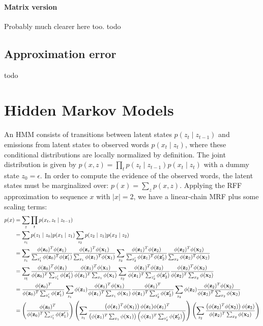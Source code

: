 \documentclass{article}
\begin{document}
\paragraph{Matrix version}
Probably much clearer here too.
todo

\subsection{Approximation error}
todo

\section{Hidden Markov Models}
An HMM consists of transitions between latent states $p(z_t \mid z_{t-1})$
and emissions from latent states to observed words $p(x_t \mid z_t)$,
where these conditional distributions are locally normalized by definition.
The joint distribution is given by $p(x, z) = \prod_t p(z_t \mid z_{t-1})p(x_t \mid z_t)$
with a dummy state $z_0 = \epsilon$.
In order to compute the evidence of the observed words, the latent states must be
marginalized over: $p(x) = \sum_z p(x,z)$.
Applying the RFF approximation to sequence $x$ with $|x| = 2$, we have
a linear-chain MRF plus some scaling terms:
\begin{equation}
\begin{aligned}
p(x) &= \sum_z \prod_t p(x_t,z_t\mid z_{t-1})\\
&= \sum_{z_1} p(z_1 \mid z_0)p(x_1 \mid z_1)  \sum_{z_2} p(z_2 \mid z_1)p(x_2 \mid z_2)\\
&= \sum_{z_1} \frac{\phi(\mathbf{z}_0)^T\phi(\mathbf{z}_1)}{\sum_{z_1'}\phi(\mathbf{z}_0)^T\phi(\mathbf{z}'_1)}
\frac{\phi(\mathbf{z}_z)^T\phi(\mathbf{x}_1)}{\sum_{x_1}\phi(\mathbf{z}_1)^T\phi(\mathbf{x}_1)}
\sum_{z_2} \frac{\phi(\mathbf{z}_1)^T\phi(\mathbf{z}_2)}{\sum_{z_2'}\phi(\mathbf{z}_1)^T\phi(\mathbf{z}_2')}
\frac{\phi(\mathbf{z}_2)^T\phi(\mathbf{x}_2)}{\sum_{x_2}\phi(\mathbf{z}_2)^T\phi(\mathbf{x}_2)}\\
&= \sum_{z_1} \frac{\phi(\mathbf{z}_0)^T\phi(\mathbf{z}_1)}{\phi(\mathbf{z}_0)^T\sum_{z_1'}\phi(\mathbf{z}'_1)}
\frac{\phi(\mathbf{z}_1)^T\phi(\mathbf{x}_1)}{\phi(\mathbf{z}_1)^T\sum_{x_1}\phi(\mathbf{x}_1)}
\sum_{z_2} \frac{\phi(\mathbf{z}_1)^T\phi(\mathbf{z}_2)}{\phi(\mathbf{z}_1)^T\sum_{z_2'}\phi(\mathbf{z}_2')}
\frac{\phi(\mathbf{z}_2)^T\phi(\mathbf{x}_2)}{\phi(\mathbf{z}_2)^T\sum_{x_2}\phi(\mathbf{x}_2)}\\
&= \frac{\phi(\mathbf{z}_0)^T}{\phi(\mathbf{z}_0)^T\sum_{z_1'}\phi(\mathbf{z}'_1)}\sum_{z_1} \phi(\mathbf{z}_1)
\frac{\phi(\mathbf{z}_1)^T\phi(\mathbf{x}_1)}{\phi(\mathbf{z}_1)^T\sum_{x_1}\phi(\mathbf{x}_1)}
\frac{\phi(\mathbf{z}_1)^T}{\phi(\mathbf{z}_1)^T\sum_{z_2'}\phi(\mathbf{z}_2')}
\sum_{z_2} \phi(\mathbf{z}_2)
\frac{\phi(\mathbf{z}_2)^T\phi(\mathbf{x}_2)}{\phi(\mathbf{z}_2)^T\sum_{x_2}\phi(\mathbf{x}_2)}\\
&= \left(\frac{\phi(\mathbf{z}_0)^T}{\phi(\mathbf{z}_0)^T\sum_{z_1'}\phi(\mathbf{z}'_1)}\right)
\left(
\sum_{z_1} 
\frac{\left(\phi(\mathbf{z}_1)^T\phi(\mathbf{x}_1)\right)\phi(\mathbf{z}_1)\phi(\mathbf{z}_1)^T}
{
    \left(\phi(\mathbf{z}_1)^T\sum_{x_1}\phi(\mathbf{x}_1)\right)
    \left(\phi(\mathbf{z}_1)^T\sum_{z_2'}\phi(\mathbf{z}_2')\right)
}
\right)
\left(
\sum_{z_2} 
\frac{\left(\phi(\mathbf{z}_2)^T\phi(\mathbf{x}_2)\right)\phi(\mathbf{z}_2)}{\phi(\mathbf{z}_2)^T\sum_{x_2}\phi(\mathbf{x}_2)}
\right)
\end{aligned}
\end{equation}
\end{document}
